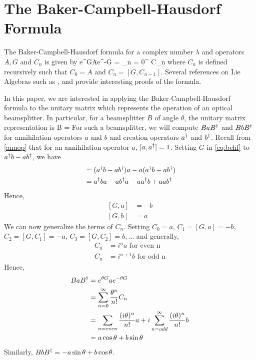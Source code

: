 \chapter{The Baker-Campbell-Hausdorf Formula\label{ch:bchf}}
The Baker-Campbell-Hausdorf formula for a complex number $\lambda$ and operators $A,G$ and $C_n$ is given by
\beq
\label{eq:bchf}
e^{\lambda G}Ae^{-\lambda G} = \sum\limits_{n = 0}^\infty {} C_n
\eeq
where $C_n$ is defined recursively such that $C_0 = A$ and $C_n = [G,C_{n-1}]$. Several references on Lie Algebras such as \cite{liealgs}, \cite{liealgs2} and \cite{liealgs3} provide interesting proofs of the formula.

In this paper, we are interested in applying the Baker-Campbell-Hausdorf formula to the unitary matrix which represents the operation of an optical beamsplitter. In particular, for a beamsplitter $B$ of angle $\theta$, the unitary matrix representation is
\beq
\label{eq:bseq}
B = 
\eeq
For such a beamsplitter, we will compute $BaB^\dagger$ and $BbB^\dagger$ for annihilation operators $a$ and $b$ and creation operators $a^\dagger$ and $b^\dagger$. Recall from \ref{annop} that for an annihilation operator $a$, $[a,a^\dagger] = 1$. 
Setting $G$ in \eqref{eq:bchf} to $a^\dagger b - ab^\dagger$, we have
\begin{align*}
[G,a] &= (\adj{a} b - a\adj{b})a - a(\adj{a} b - a\adj{b}) \\
&= \adj{a}ba - a\adj{b}a - a\adj{a}b + aa\adj{b}
\end{align*}
Hence, 
\begin{align}
\label{eq:Gcommutes}
[G,a] &= -b\\
[G,b] &= a
\end{align}
We can now generalize the terms of $C_n$. Setting $C_0 = a$, $C_1 = [G,a] = -b$, $C_2 = [G,C_1] = -a$, $C_3 = [G,C_2] = b,\ldots$ and generally,
\begin{align*}
C_n &= i^na \text{ for even n}\\
C_n &= i^{n+1}b \text{ for odd n}
\end{align*}
Hence,
\begin{align*}
BaB^\dagger &= e^{\theta G}ae^{-\theta G}\\
&= \sum\limits_{n=0}^\infty \frac{\theta^n}{n!}C_n\\
&= \sum\limits_{n = even} \frac{(i\theta)^n}{n!}a + i\sum\limits_{n = odd}^\infty \frac{(i\theta)^n}{n!}b\\
&= a\cos\theta + b\sin\theta
\end{align*}
Similarly, $BbB^\dagger = -a\sin\theta + b\cos\theta$.

